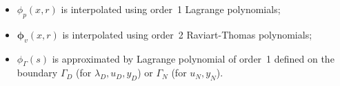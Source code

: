 \documentclass{ifacconf}
\begin{document}
\begin{itemize}
    \item $\phi_p(x, r)$ is interpolated using order~1 Lagrange polynomials;
    \item $\bm{\phi}_v(x, r)$ is interpolated using order~2 Raviart-Thomas polynomials;
    \item ${\phi}_\Gamma(s)$ is approximated by Lagrange polynomial of order~1 defined on the boundary $\Gamma_D$ (for $\lambda_D, u_D, y_D$) or $\Gamma_N$ (for $u_N, y_N$).
\end{itemize}

\end{document}
